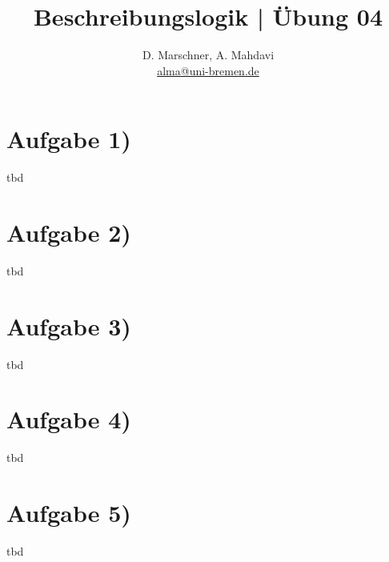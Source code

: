 \documentclass[12pt]{article}
\begin{document}
 
\title{Beschreibungslogik | Übung 04}
\author{D. Marschner, A. Mahdavi\\
\href{mailto:alma@uni-bremen.de}{alma@uni-bremen.de}}
\date{}
\maketitle
\section*{Aufgabe 1)}
tbd

\section*{Aufgabe 2)}
tbd

\section*{Aufgabe 3)}
tbd

\section*{Aufgabe 4)}
tbd

\section*{Aufgabe 5)}
tbd


 
\end{document}
